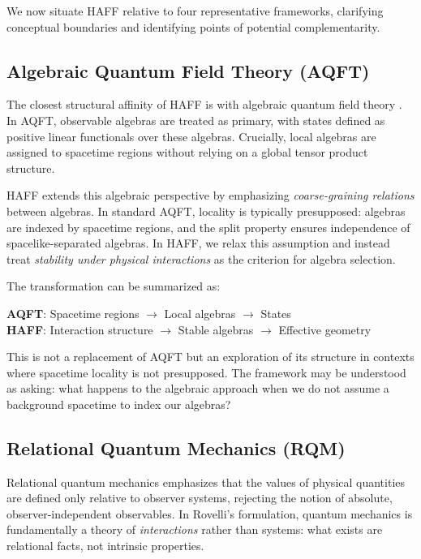 \documentclass[12pt,a4paper]{article}
\begin{document}
We now situate HAFF relative to four representative frameworks, clarifying conceptual boundaries and identifying points of potential complementarity.

\subsection{Algebraic Quantum Field Theory (AQFT)}

The closest structural affinity of HAFF is with algebraic quantum field theory \cite{Haag1996,Araki1999}. In AQFT, observable algebras are treated as primary, with states defined as positive linear functionals over these algebras. Crucially, local algebras are assigned to spacetime regions without relying on a global tensor product structure.

HAFF extends this algebraic perspective by emphasizing \emph{coarse-graining relations} between algebras. In standard AQFT, locality is typically presupposed: algebras are indexed by spacetime regions, and the split property ensures independence of spacelike-separated algebras. In HAFF, we relax this assumption and instead treat \emph{stability under physical interactions} as the criterion for algebra selection.

The transformation can be summarized as:
\begin{center}
\textbf{AQFT}: Spacetime regions $\to$ Local algebras $\to$ States \\
\textbf{HAFF}: Interaction structure $\to$ Stable algebras $\to$ Effective geometry
\end{center}

This is not a replacement of AQFT but an exploration of its structure in contexts where spacetime locality is not presupposed. The framework may be understood as asking: what happens to the algebraic approach when we do not assume a background spacetime to index our algebras?

\subsection{Relational Quantum Mechanics (RQM)}

Relational quantum mechanics \cite{Rovelli1996,LaudisaRovelli2021} emphasizes that the values of physical quantities are defined only relative to observer systems, rejecting the notion of absolute, observer-independent observables. In Rovelli's formulation, quantum mechanics is fundamentally a theory of \emph{interactions} rather than systems: what exists are relational facts, not intrinsic properties.
\end{document}
